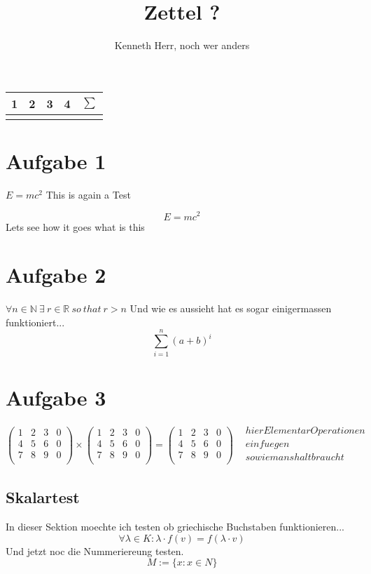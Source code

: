 \documentclass{article}
\author{Kenneth Herr, noch wer anders}
\title{Zettel ?}
\begin{document}
\begin{table} [t!]
  \begin{tabular}{c | c | c | c | c}
    1   & 2 & 3 & 4 & \(\sum\) \\
    \hline
      &   &   &    & \\
    \end{tabular}
  \end{table}

  \maketitle
\section{Aufgabe 1}
\begin{math}
E = mc^{2}
\end{math}
This is again a Test

\begin{equation}
  E = mc^{2}
  \end{equation}
Lets see how it goes what is this
\section{Aufgabe 2}
 $ \forall n \in \mathbb{N} \:  \exists \: r  \in \mathbb{R} \: so \: that \: r > n $
 Und wie es aussieht hat es sogar einigermassen funktioniert...
 $$ \sum_{i =1} ^{n} (a + b)^{i} $$
 \section{Aufgabe 3}
 \begin{math}
 \begin{pmatrix}
   1 & 2 & 3  & 0 \\
   4 & 5 & 6  & 0 \\
   7 & 8 & 9  & 0 \\
 \end{pmatrix}
 \times
 \begin{pmatrix}
   1 & 2 & 3  & 0 \\
   4 & 5 & 6  & 0 \\
   7 & 8 & 9  & 0 \\
 \end{pmatrix}
 =
 \begin{pmatrix}
   1 & 2 & 3  & 0 \\
   4 & 5 & 6  & 0 \\
   7 & 8 & 9  & 0 \\
 \end{pmatrix}
 \begin{matrix}
   & hier Elementar Operationen \\
   & einfuegen \\
   & so wie mans halt braucht \\
   \end{matrix}
 \end{math}
 \subsection{Skalartest}
 In dieser Sektion moechte ich testen ob griechische Buchstaben funktionieren...
 $$ \forall \lambda \in K : \lambda \cdot f(v) = f(\lambda \cdot v) $$
 Und jetzt noc die Nummeriereung testen.
 \begin{equation}
   M := \{ x: x \in N \}
   \end{equation}
 
\end{document}
